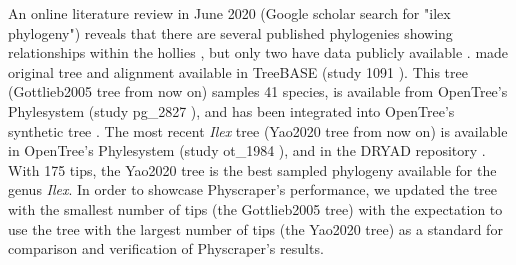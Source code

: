 \documentclass{bmcart}
\begin{document}
An online literature review in June 2020 (Google scholar search for "ilex phylogeny")
reveals that there are several published phylogenies showing relationships within
the hollies \cite{cuenoud2000molecular, manen2010history, setoguchi2000intersectional,
selbach2009new}, but only two have data publicly available \cite{gottlieb2005molecular, yao2020phylogeny}.
\cite{gottlieb2005molecular} made original tree and alignment available in TreeBASE
(study 1091 \cite{treebase1091}). This tree (Gottlieb2005 tree from now on) samples 41 species, is available from
OpenTree's Phylesystem (study pg\_2827 \cite{pg2827}),
and has been integrated into OpenTree's synthetic tree \cite{mrcaott68451ott89474}.
The most recent \textit{Ilex} tree \cite{yao2020phylogeny} (Yao2020 tree from now on) is available in
OpenTree's Phylesystem (study ot\_1984 \cite{ot1984}),
and in the DRYAD repository \cite{yao2020dryad}.
With 175 tips, the Yao2020 tree \cite{yao2020phylogeny} is the best sampled phylogeny available for
the genus \textit{Ilex}.
In order to showcase Physcraper's performance, we updated
the tree with the smallest number of tips (the Gottlieb2005 tree) with the expectation
to use the tree with the largest number of tips (the Yao2020 tree) as a standard
for comparison and verification of Physcraper's results.
\end{document}
